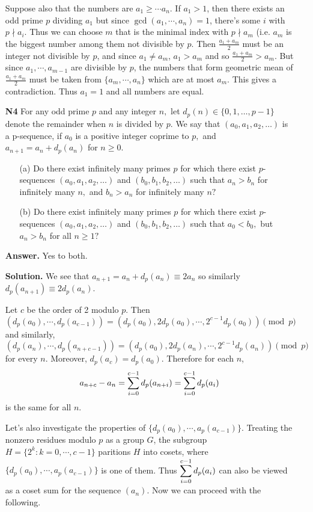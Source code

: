 \documentclass[11pt,a4paper]{article}
\begin{document}
\begin{enumerate}
	Suppose also that the numbers are $a_1\ge \cdots a_n$. If $a_1>1$, then there exists an odd prime $p$ dividing $a_1$ but since $\gcd(a_1, \cdots , a_n)=1$, there's some $i$ with $p\nmid a_i$. Thus we can choose $m$ that is the minimal index with $p\nmid a_m$ (i.e. $a_m$ is the biggest number among them not divisible by $p$. Then $\frac{a_1+a_m}{2}$ must be an integer not divisible by $p$, and since $a_1\neq a_m$, $a_1>a_m$ and so $\frac{a_1+a_m}{2}>a_m$. But since $a_1, \cdots , a_{m-1}$ are divisible by $p$, the numbers that form geometric mean of $\frac{a_1+a_m}{2}$ must be taken from $\{a_m, \cdots , a_n\}$ which are at most $a_m$. This gives a contradiction. Thus $a_1=1$ and all numbers are equal.
	
	\item[\textbf{N4}] For any odd prime $p$ and any integer $n,$ let $d_p (n) \in \{ 0,1, \dots, p-1 \}$ denote the remainder when $n$ is divided by $p.$ We say that $(a_0, a_1, a_2, \dots)$ is a p-sequence, if $a_0$ is a positive integer coprime to $p,$ and $a_{n+1} =a_n + d_p (a_n)$ for $n \geqslant 0.$
	\begin{itemize}
		\item[(a)] Do there exist infinitely many primes $p$ for which there exist $p$-sequences $(a_0, a_1, a_2, \dots)$ and $(b_0, b_1, b_2, \dots)$ such that $a_n >b_n$ for infinitely many $n,$ and $b_n > a_n$ for infinitely many $n?$
		
		\item[(b)] Do there exist infinitely many primes $p$ for which there exist $p$-sequences $(a_0, a_1, a_2, \dots)$ and $(b_0, b_1, b_2, \dots)$ such that $a_0 <b_0,$ but $a_n >b_n$ for all $n \geqslant 1?$
	\end{itemize}
	
	\textbf{Answer.} Yes to both. 
	
	\textbf{Solution.} We see that $a_{n+1}=a_n+d_p(a_n)\equiv 2a_n$ so similarly $d_p(a_{n+1})\equiv 2 d_p(a_n)$. 
	
	Let $c$ be the order of 2 modulo $p$. Then 
	\[(d_p(a_0), \cdots, d_p(a_{c-1}))=(d_p(a_0), 2d_p(a_0), \cdots, 2^{c-1}d_p(a_0))\pmod{p}
	\]
	and similarly, 
	\[(d_p(a_n), \cdots, d_p(a_{n+c-1}))=(d_p(a_0), 2d_p(a_n), \cdots, 2^{c-1}d_p(a_n))\pmod{p}
	\]
	for every $n$. 
	Moreover, $d_p(a_c)=d_p(a_0)$. Therefore for each $n$, 
	\[
	a_{n+c}-a_n = \displaystyle\sum_{i=0}^{c-1} d_p(a_{n+i}) = \displaystyle\sum_{i=0}^{c-1} d_p(a_i)
	\]
	is the same for all $n$. 
	
	Let's also investigate the properties of $\{d_p(a_0), \cdots, a_p(a_{c-1})\}$. Treating the nonzero residues modulo $p$ as a group $G$, the subgroup $H=\{2^k: k=0, \cdots, c-1\}$ paritions $H$ into cosets, where $\{d_p(a_0), \cdots, a_p(a_{c-1})\}$ is one of them. Thus $\displaystyle\sum_{i=0}^{c-1} d_p(a_i)$ can also be viewed as a coset sum for the sequence $(a_n)$. Now we can proceed with the following. 
	

\end{enumerate}
\end{document}
